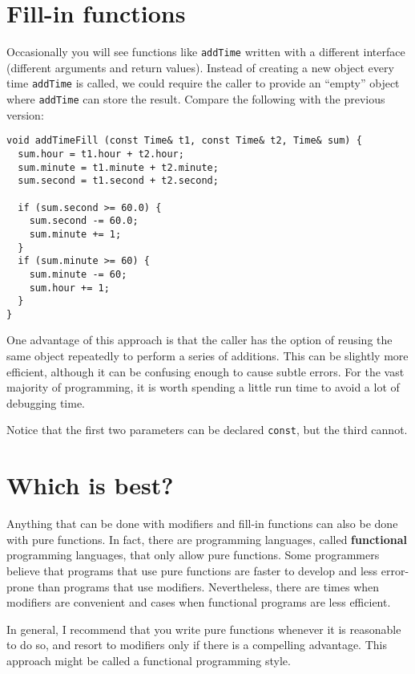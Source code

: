 \section{Fill-in functions}

Occasionally you will see functions like {\tt addTime} written
with a different interface (different arguments and return values).
Instead of creating a new object every time {\tt addTime} is
called, we could require the caller to provide an ``empty''
object where {\tt addTime} can store the result.  Compare
the following with the previous version:

\begin{verbatim}
void addTimeFill (const Time& t1, const Time& t2, Time& sum) {
  sum.hour = t1.hour + t2.hour;
  sum.minute = t1.minute + t2.minute;
  sum.second = t1.second + t2.second;

  if (sum.second >= 60.0) {
    sum.second -= 60.0;
    sum.minute += 1;
  }
  if (sum.minute >= 60) {
    sum.minute -= 60;
    sum.hour += 1;
  }
}
\end{verbatim}
%
One advantage of this approach is that the caller has the option of
reusing the same object repeatedly to perform a series of additions.
This can be slightly more efficient, although it can be confusing
enough to cause subtle errors.  For the vast majority of programming,
it is worth spending a little run time to avoid a lot of debugging
time.

Notice that the first two parameters can be declared {\tt const},
but the third cannot.

\section{Which is best?}

Anything that can be done with modifiers and fill-in functions can also
be done with pure functions.  In fact, there are programming
languages, called {\bf functional} programming languages, that only
allow pure functions.  Some programmers believe that programs that use
pure functions are faster to develop and less error-prone than
programs that use modifiers.  Nevertheless, there are times when
modifiers are convenient and cases when functional programs
are less efficient.

In general, I recommend that you write pure functions whenever
it is reasonable to do so, and resort to modifiers only if there
is a compelling advantage.  This approach might be called a
functional programming style.

